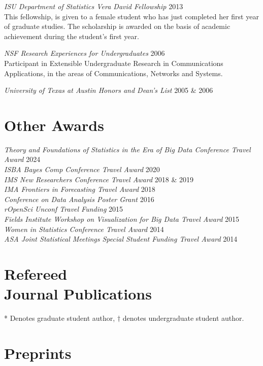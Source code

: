 \documentclass[margin,line]{res}
\begin{document}
\begin{resume}
{\em ISU Department of Statistics Vera David Fellowship } \hfill 2013\\
This fellowship, is given to a female student who has just completed her first year of graduate studies. The scholarship is awarded on the basis of academic achievement during the student’s first year.

{\em NSF Research Experiences for Undergraduates } \hfill 2006\\
Participant in Extensible Undergraduate Research in Communications Applications, in the areas of Communications, Networks and Systems.

{\em University of Texas at Austin Honors and Dean's List } \hfill 2005 \& 2006

\section{\sc Other Awards}
{\em Theory and Foundations of Statistics in the Era of Big Data Conference Travel Award} \hfill 2024\\
{\em ISBA Bayes Comp Conference Travel Award} \hfill 2020 \\
{\em IMS New Researchers Conference Travel Award} \hfill 2018 \& 2019 \\
{\em IMA Frontiers in Forecasting Travel Award} \hfill 2018\\
{\em Conference on Data Analysis Poster Grant } \hfill 2016\\
{\em rOpenSci Unconf Travel Funding } \hfill 2015\\
{\em Fields Institute Workshop on Visualization for Big Data Travel Award } \hfill 2015\\
{\em Women in Statistics Conference Travel Award } \hfill 2014\\
{\em ASA Joint Statistical Meetings Special Student Funding Travel Award } \hfill 2014

\section{\sc Refereed \\ Journal Publications} 
* Denotes graduate student author, $\dagger$ denotes undergraduate student author. 
\printbibliography[keyword=refereed, heading=none, resetnumbers=true]

\section{\sc Preprints}
\printbibliography[keyword=submitted, heading=none, resetnumbers=false]


\end{resume}
\end{document}
